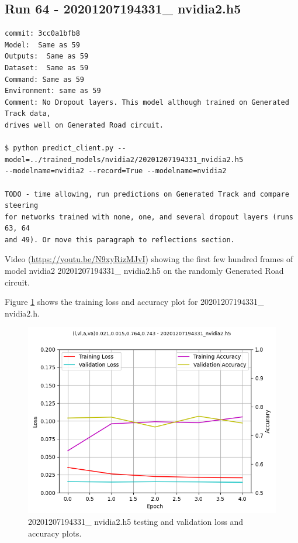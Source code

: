 \subsection{Run 64 - 20201207194331\_ nvidia2.h5}
\label{app_res:64}
\begin{verbatim}
commit: 3cc0a1bfb8
Model:  Same as 59
Outputs:  Same as 59
Dataset:  Same as 59
Command: Same as 59
Environment: same as 59 
Comment: No Dropout layers. This model although trained on Generated Track data,
drives well on Generated Road circuit.

$ python predict_client.py --model=../trained_models/nvidia2/20201207194331_nvidia2.h5
--modelname=nvidia2 --record=True --modelname=nvidia2

TODO - time allowing, run predictions on Generated Track and compare steering
for networks trained with none, one, and several dropout layers (runs 63, 64
and 49). Or move this paragraph to reflections section.
\end{verbatim}
Video (\url{https://youtu.be/N9xyRizMJvI}) showing the first few hundred frames of model  
nvidia2 20201207194331\_ nvidia2.h5 on the randomly Generated Road circuit.

Figure \ref{fig:20201207194331_nvidia2_accuracy} 
shows the training loss and accuracy plot for 20201207194331\_ nvidia2.h.

\begin{figure}[h!]
\centering
\includegraphics[width=\textwidth]{Figures/20201207194331_nvidia2_accuracy.png}
\caption{20201207194331\_ nvidia2.h5 testing and validation loss and accuracy plots. }
\label{fig:20201207194331_nvidia2_accuracy}
\end{figure}
